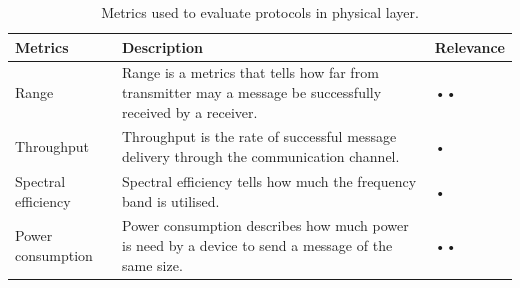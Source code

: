 \begin{table}[ht]
     \centering
    \begin{tabularx}{\textwidth}{|l|X|p{5em}|}
    \hline
    \textbf{Metrics}&\textbf{Description}&\textbf{Relevance}\\
    \hline
    Range&Range is a metrics that tells how far from transmitter may a message be successfully received by a receiver.&••\\
    Throughput&Throughput is the rate of successful message delivery through the communication channel.&•\\
    Spectral efficiency&Spectral efficiency tells how much the frequency band is utilised.&•\\
    Power consumption&Power consumption describes how much power is need by a device to send a message of the same size.&••\\
    \hline
    \end{tabularx}
    
    \caption{Metrics used to evaluate protocols in physical layer.}
    \label{tab:metrics-physical}
\end{table}{}
